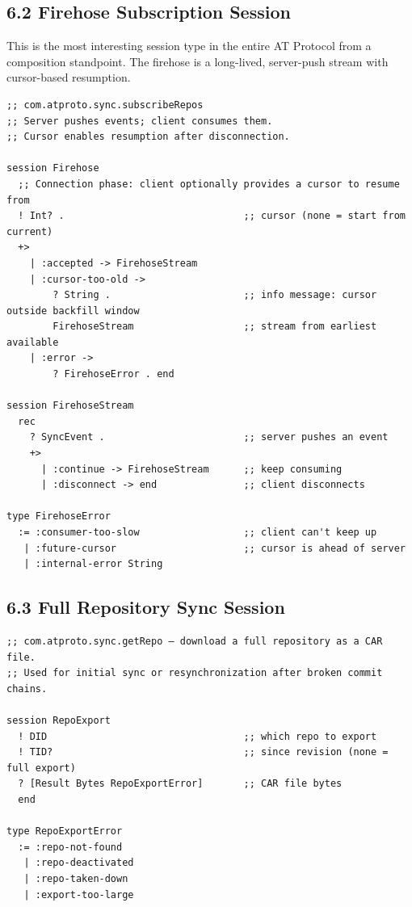\documentclass[11pt]{article}
\begin{document}
\subsection{6.2 Firehose Subscription Session}
\label{sec:org73e5343}

This is the most interesting session type in the entire AT Protocol from a
composition standpoint. The firehose is a long-lived, server-push stream
with cursor-based resumption.

\begin{verbatim}
;; com.atproto.sync.subscribeRepos
;; Server pushes events; client consumes them.
;; Cursor enables resumption after disconnection.

session Firehose
  ;; Connection phase: client optionally provides a cursor to resume from
  ! Int? .                               ;; cursor (none = start from current)
  +>
    | :accepted -> FirehoseStream
    | :cursor-too-old ->
        ? String .                       ;; info message: cursor outside backfill window
        FirehoseStream                   ;; stream from earliest available
    | :error ->
        ? FirehoseError . end

session FirehoseStream
  rec
    ? SyncEvent .                        ;; server pushes an event
    +>
      | :continue -> FirehoseStream      ;; keep consuming
      | :disconnect -> end               ;; client disconnects

type FirehoseError
  := :consumer-too-slow                  ;; client can't keep up
   | :future-cursor                      ;; cursor is ahead of server
   | :internal-error String
\end{verbatim}
\subsection{6.3 Full Repository Sync Session}
\label{sec:orgf6a5104}

\begin{verbatim}
;; com.atproto.sync.getRepo — download a full repository as a CAR file.
;; Used for initial sync or resynchronization after broken commit chains.

session RepoExport
  ! DID                                  ;; which repo to export
  ! TID?                                 ;; since revision (none = full export)
  ? [Result Bytes RepoExportError]       ;; CAR file bytes
  end

type RepoExportError
  := :repo-not-found
   | :repo-deactivated
   | :repo-taken-down
   | :export-too-large
\end{verbatim}
\end{document}
